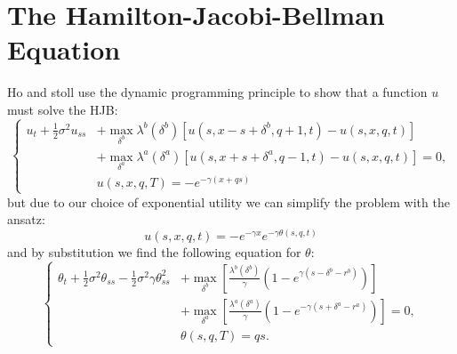 \section{The Hamilton-Jacobi-Bellman Equation}\label{sec:3.7}
Ho and stoll use the dynamic programming principle to show that a function $u$ must solve the HJB:
\begin{equation}\label{eq:hjb-1}
    \left\{
        \begin{aligned}
            u_t+\frac{1}{2}\sigma^2u_{ss}&+\max\limits_{\delta^b}\lambda^b(\delta^b)[u(s,x-s+\delta^b,q+1,t)-u(s,x,q,t)]\\
            &+\max\limits_{\delta^a}\lambda^a(\delta^a)[u(s,x+s+\delta^a,q-1,t)-u(s,x,q,t)]=0,\\
            &u(s,x,q,T)=-e^{-\gamma(x+qs)}
        \end{aligned}
    \right.
\end{equation}
but due to our choice of exponential utility we can simplify the problem with the ansatz:
$$u(s,x,q,t)=-e^{-\gamma x}e^{-\gamma\theta(s,q,t)}$$
and by substitution we find the following equation for $\theta$:
\begin{equation}\label{eq:hjb-2}
    \left\{
        \begin{aligned}
            \theta_t+\frac{1}{2}\sigma^2\theta_{ss}-\frac{1}{2}\sigma^2\gamma\theta_{ss}^2&+\max\limits_{\delta^b}\left[\frac{\lambda^b(\delta^b)}{\gamma}(1-e^{\gamma(s-\delta^b-r^b)})\right]\\
            &+\max\limits_{\delta^a}\left[\frac{\lambda^a(\delta^a)}{\gamma}(1-e^{-\gamma(s+\delta^a-r^a)})\right]=0,\\
            &\theta(s,q,T)=qs.
        \end{aligned}
    \right.
\end{equation}
